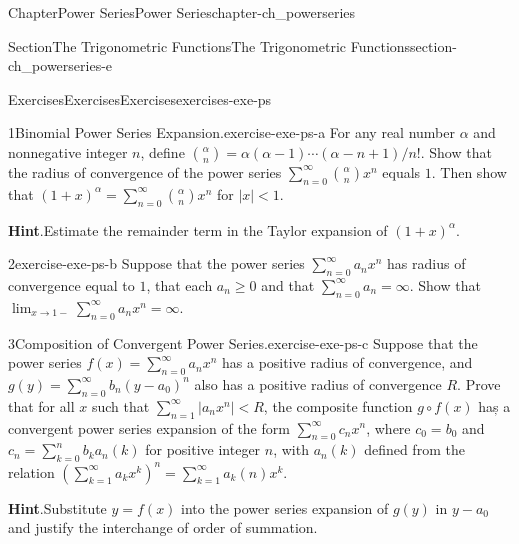 \documentclass[oneside,10pt,]{book}
\newcommand{\blocktitlefont}{\relax}
\numberwithin{equation}{section}
\newcommand{\lt}{<}
\begin{document}
\begin{chapterptx}{Chapter}{Power Series}{}{Power Series}{}{}{chapter-ch_powerseries}
\begin{sectionptx}{Section}{The Trigonometric Functions}{}{The Trigonometric Functions}{}{}{section-ch_powerseries-e}
\end{sectionptx}
%
%
\typeout{************************************************}
\typeout{************************************************}
%
\begin{exercises-section}{Exercises}{Exercises}{}{Exercises}{}{}{exercises-exe-ps}
\begin{divisionexercise}{1}{Binomial Power Series Expansion.}{}{exercise-exe-ps-a}%
For any real number \(\alpha\) and nonnegative integer \(n\), define \(\binom{\alpha}{n}=\alpha (\alpha-1)\cdots (\alpha-n+1)/n!\). Show that the radius of convergence of the power series \(\sum_{n=0}^{\infty} \binom{\alpha}{n} x^{n}\) equals \(1\). Then show that \((1+x)^{\alpha}= \sum_{n=0}^{\infty} \binom{\alpha}{n} x^{n}\) for \(|x|\lt 1\).\par\smallskip%
\noindent\textbf{\blocktitlefont Hint}.\hypertarget{hint-exe-ps-a-c}{}\quad{}Estimate the remainder term in the  Taylor expansion of \((1+x)^{\alpha}\).\end{divisionexercise}%
\begin{divisionexercise}{2}{}{}{exercise-exe-ps-b}%
Suppose that the power series \(\sum_{n=0}^{\infty} a_{n}x^{n}\) has radius of convergence equal to \(1\), that each \(a_{n}\ge 0\) and that \(\sum_{n=0}^{\infty} a_{n}=\infty\). Show that \(\lim_{x\to 1-} \sum_{n=0}^{\infty} a_{n}x^{n}=\infty\).\end{divisionexercise}%
\begin{divisionexercise}{3}{Composition of Convergent Power Series.}{}{exercise-exe-ps-c}%
Suppose that the power series \(f(x)=\sum_{n=0}^{\infty} a_{n}x^{n}\) has a positive radius of convergence, and \(g(y)=\sum_{n=0}^{\infty} b_{n} (y-a_{0})^{n}\) also has a positive radius of convergence \(R\). Prove that for all \(x\) such that \(\sum_{n=1}^{\infty}  |a_{n}x^{n}| \lt R\), the composite function \(g\circ f(x)\) haș a convergent power series expansion of the form \(\sum_{n=0}^{\infty} c_{n}x^{n}\), where \(c_{0}=b_{0}\) and \(c_{n}=\sum_{k=0}^{n} b_{k} a_{n}(k)\) for positive integer \(n\), with \(a_{n}(k)\) defined from the relation \((\sum_{k=1}^{\infty} a_{k}x^{k})^{n}
=\sum_{k=1}^{\infty} a_{k}(n) x^{k}\).\par\smallskip%
\noindent\textbf{\blocktitlefont Hint}.\hypertarget{hint-exe-ps-c-c}{}\quad{}Substitute \(y=f(x)\) into the power series expansion of \(g(y)\) in \(y-a_{0}\) and justify the interchange of order of summation.\end{divisionexercise}%
\end{exercises-section}
\end{chapterptx}
\end{document}

